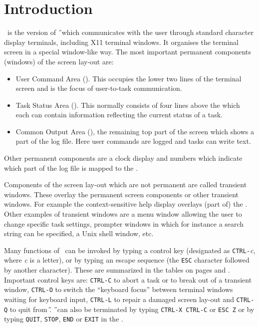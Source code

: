 \section{Introduction}
\tH\ is the version of \H\ which communicates with the user through standard
character display terminals, including X11 terminal windows.
It organises the terminal screen in a special window-like way.
The most important permanent components (windows) of the screen lay-out are:
\begin{itemize}
\item
User Command Area (\UCA ). This occupies the lower two lines of the terminal
screen and is the focus of user-to-task communication.
\item
Task Status Area (\TSA ). This normally consists of four lines above the {\UCA}
which each can contain information reflecting the current status of a task.
\item
Common Output Area (\COA ), the remaining top part of the screen which
shows a part of the log file.
Here user commands are logged and tasks can write text.
\end{itemize}
Other permanent components are a clock display and numbers which indicate
which part of the log file is mapped to the \COA .

Components of the screen lay-out which are not permanent are called transient
windows.
These overlay the permanent screen components or other transient windows.
For example the context-sensitive help display overlays (part of) the \COA .
Other examples of transient windows are
a menu window allowing the user to change specific task settings, prompter
windows in which for instance a search string can be specified, a Unix shell
window, etc.

Many functions of \tH\ can be invoked by typing a control key (designated
as {\tt CTRL-}{\it c}, where {\it c} is a letter), or by typing an escape
sequence (the {\tt ESC} character followed by another character).
These are summarized in the tables on pages \pageref{escseqs} and
\pageref{ctrlkeys}.
Important control keys are: {\tt CTRL-C} to abort
a task or to break out of a transient window, {\tt CTRL-O}\label{ctrlo}
to switch the
``keyboard focus'' between terminal windows waiting for keyboard input,
{\tt CTRL-L}\label{ctrll} to repair a damaged screen lay-out
and {\tt CTRL-Q}\label{ctrlq} to quit from \H.
\H\ can also be terminated by typing {\tt CTRL-X CTRL-C}\label{ctrlxctrlc} or
{\tt ESC Z}\label{escz} or by typing {\tt QUIT}, {\tt STOP}, {\tt END} or
{\tt EXIT} in the \UCA.

